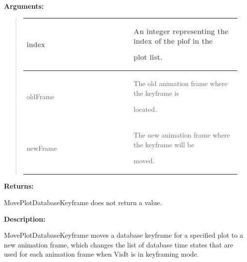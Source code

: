 \documentclass[letterpaper,10pt,english]{sphinxmanual}
\begin{document}
\begin{DUlineblock}{0em}
\item[] 
\item[] \textbf{Arguments:}
\end{DUlineblock}
\begin{quote}

\begin{tabular}{|p{0.475\linewidth}|p{0.475\linewidth}|}
\hline

index
 & 
\begin{DUlineblock}{0em}
\item[] An integer representing the index of the plof in the
\item[] plot list.
\end{DUlineblock}
\\
\hline
oldFrame
 & 
\begin{DUlineblock}{0em}
\item[] The old animation frame where the keyframe is
\item[] located.
\end{DUlineblock}
\\
\hline
newFrame
 & 
\begin{DUlineblock}{0em}
\item[] The new animation frame where the keyframe will be
\item[] moved.
\end{DUlineblock}
\\
\hline\end{tabular}

\end{quote}

\begin{DUlineblock}{0em}
\item[] 
\item[] \textbf{Returns:}
\item[] MovePlotDatabaseKeyframe does not return a value.
\item[] 
\item[] \textbf{Description:}
\item[] MovePlotDatabaseKeyframe moves a database keyframe for a specified plot to
a new animation frame, which changes the list of database time states that
are used for each animation frame when VisIt is in keyframing mode.
\end{DUlineblock}

\begin{DUlineblock}{0em}
\item[] 
\end{DUlineblock}
\end{document}
